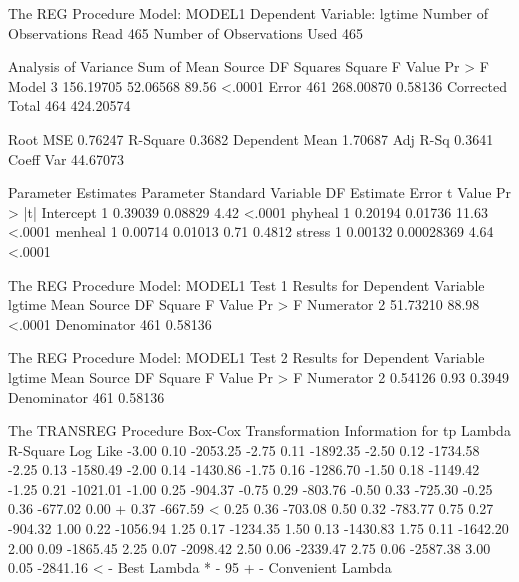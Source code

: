 \documentclass{article}
\begin{document}
\begin{Woutput}
The REG Procedure
Model: MODEL1
Dependent Variable: lgtime
Number of Observations Read         465
Number of Observations Used         465

                             Analysis of Variance
                                    Sum of           Mean
Source                   DF        Squares         Square    F Value    Pr > F
Model                     3      156.19705       52.06568      89.56    <.0001
Error                   461      268.00870        0.58136
Corrected Total         464      424.20574

Root MSE              0.76247    R-Square     0.3682
Dependent Mean        1.70687    Adj R-Sq     0.3641
Coeff Var            44.67073

                        Parameter Estimates
                     Parameter       Standard
Variable     DF       Estimate          Error    t Value    Pr > |t|
Intercept     1        0.39039        0.08829       4.42      <.0001
phyheal       1        0.20194        0.01736      11.63      <.0001
menheal       1        0.00714        0.01013       0.71      0.4812
stress        1        0.00132     0.00028369       4.64      <.0001

The REG Procedure
Model: MODEL1
      Test 1 Results for Dependent Variable lgtime
                                Mean
Source             DF         Square    F Value    Pr > F
Numerator           2       51.73210      88.98    <.0001
Denominator       461        0.58136

The REG Procedure
Model: MODEL1
      Test 2 Results for Dependent Variable lgtime
                                Mean
Source             DF         Square    F Value    Pr > F
Numerator           2        0.54126       0.93    0.3949
Denominator       461        0.58136

The TRANSREG Procedure
Box-Cox Transformation Information for tp
  Lambda      R-Square    Log Like
   -3.00          0.10    -2053.25
   -2.75          0.11    -1892.35
   -2.50          0.12    -1734.58
   -2.25          0.13    -1580.49
   -2.00          0.14    -1430.86
   -1.75          0.16    -1286.70
   -1.50          0.18    -1149.42
   -1.25          0.21    -1021.01
   -1.00          0.25     -904.37
   -0.75          0.29     -803.76
   -0.50          0.33     -725.30
   -0.25          0.36     -677.02
    0.00 +        0.37     -667.59 <
    0.25          0.36     -703.08
    0.50          0.32     -783.77
    0.75          0.27     -904.32
    1.00          0.22    -1056.94
    1.25          0.17    -1234.35
    1.50          0.13    -1430.83
    1.75          0.11    -1642.20
    2.00          0.09    -1865.45
    2.25          0.07    -2098.42
    2.50          0.06    -2339.47
    2.75          0.06    -2587.38
    3.00          0.05    -2841.16
< - Best Lambda
* - 95%
+ - Convenient Lambda
\end{Woutput}
\end{document}

